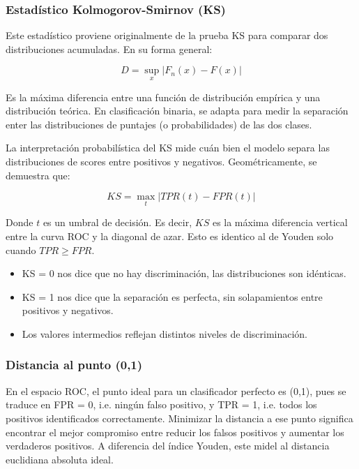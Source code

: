     \subsubsection{Estadístico Kolmogorov-Smirnov (KS)}

    Este estadístico proviene originalmente de la prueba KS para comparar dos distribuciones acumuladas. En
    su forma general:

    \[
        D = \sup_x |F_n(x) - F(x)|
    \]

    Es la máxima diferencia entre una función de distribución empírica y una distribución teórica. En
    clasificación binaria, se adapta para medir la separación enter las distribuciones de puntajes (o probabilidades)
    de las dos clases. 

    La interpretación probabilística del KS mide cuán bien el modelo separa las distribuciones de scores
    entre positivos y negativos. Geométricamente, se demuestra que:

    \[
        KS = \max_t |TPR(t) - FPR(t)|
    \]

    Donde $t$ es un umbral de decisión. Es decir, $KS$ es la máxima diferencia vertical entre la curva ROC
    y la diagonal de azar. Esto es identico al de Youden solo cuando $TPR \geq FPR$. 

    \begin{itemize}
        \item KS = 0 nos dice que no hay discriminación, las distribuciones son idénticas.
        \item KS = 1 nos dice que la separación es perfecta, sin solapamientos entre positivos y negativos.
        \item Los valores intermedios reflejan distintos niveles de discriminación.
    \end{itemize}

\subsubsection{Distancia al punto (0,1)}

En el espacio ROC, el punto ideal para un clasificador perfecto es (0,1), pues se traduce en FPR = 0, i.e. ningún
falso positivo, y TPR = 1, i.e. todos los positivos identificados correctamente. Minimizar la distancia a 
ese punto significa encontrar el mejor compromiso entre reducir los falsos positivos y aumentar los verdaderos positivos. A 
diferencia del índice Youden, este midel al distancia euclidiana absoluta ideal. 


